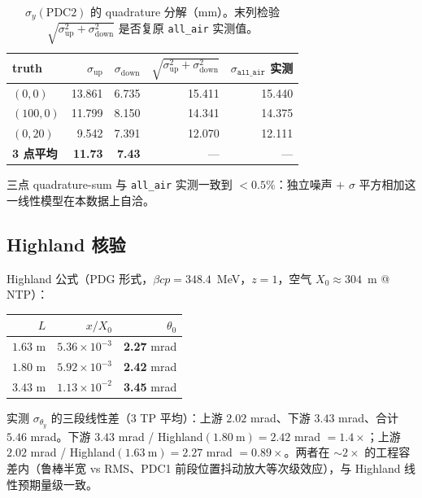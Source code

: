 \documentclass[a4paper, 11pt]{article}
\begin{document}
\begin{table}[H]
\centering
\caption{$\sigma_y(\mathrm{PDC2})$ 的 quadrature 分解（mm）。末列检验 $\sqrt{\sigma_\mathrm{up}^{2}+\sigma_\mathrm{down}^{2}}$ 是否复原 \texttt{all\_air} 实测值。}
\label{tab:delta_quadrature}
\begin{tabular}{lrrrr}
\toprule
truth & $\sigma_\mathrm{up}$ & $\sigma_\mathrm{down}$ & $\sqrt{\sigma_\mathrm{up}^{2}+\sigma_\mathrm{down}^{2}}$ & $\sigma_{\mathtt{all\_air}}$ 实测 \\
\midrule
$(0,0)$   & 13.861 & 6.735 & 15.411 & 15.440 \\
$(100,0)$ & 11.799 & 8.150 & 14.341 & 14.375 \\
$(0,20)$  &  9.542 & 7.391 & 12.070 & 12.111 \\
\midrule
\textbf{3 点平均} & \textbf{11.73} & \textbf{7.43} & — & — \\
\bottomrule
\end{tabular}
\end{table}

三点 quadrature-sum 与 \texttt{all\_air} 实测一致到 $<0.5\%$：独立噪声 $+$ $\sigma$ 平方相加这一线性模型在本数据上自洽。

\subsection{Highland 核验}

Highland 公式（PDG 形式，$\beta c p = 348.4$~MeV，$z=1$，空气 $X_0 \approx 304$~m @ NTP）：

\begin{center}
\begin{tabular}{rrr}
\toprule
$L$ & $x/X_0$ & $\theta_0$ \\
\midrule
$1.63$ m & $5.36\times 10^{-3}$ & \textbf{2.27} mrad \\
$1.80$ m & $5.92\times 10^{-3}$ & \textbf{2.42} mrad \\
$3.43$ m & $1.13\times 10^{-2}$ & \textbf{3.45} mrad \\
\bottomrule
\end{tabular}
\end{center}

实测 $\sigma_{\theta_y}$ 的三段线性差（3 TP 平均）：上游 $2.02$ mrad、下游 $3.43$ mrad、合计 $5.46$ mrad。下游 $3.43$ mrad / Highland$(1.80\ \mathrm{m})=2.42$ mrad $= 1.4\times$；上游 $2.02$ mrad / Highland$(1.63\ \mathrm{m})=2.27$ mrad $= 0.89\times$。两者在 $\sim 2\times$ 的工程容差内（鲁棒半宽 vs RMS、PDC1 前段位置抖动放大等次级效应），与 Highland 线性预期量级一致。
\end{document}
